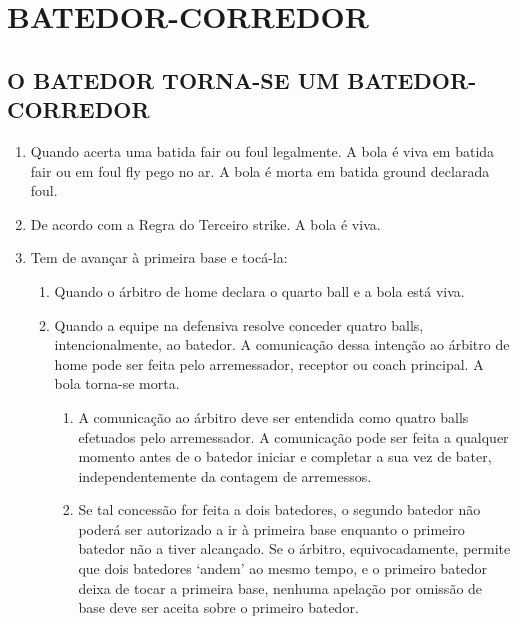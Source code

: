 	\section{BATEDOR-CORREDOR} 
\begin{multicols}{2}
	
	\subsection{O BATEDOR TORNA-SE UM BATEDOR-CORREDOR}
	
	\begin{enumerate}[label=\alph*)]
		\item Quando acerta uma batida \gls{fair} ou \gls{foul} legalmente. A bola \'e viva em batida \gls{fair} 
		ou em \gls{foul fly} pego no ar. A bola \'e morta em batida \gls{ground} declarada \gls{foul}. 
		
		\item  De acordo com a Regra do Terceiro \gls{strike}. A bola \'e viva. 
		
		\item  Tem de avan\c{c}ar \`a primeira base e toc\'a-la: 
		
		\begin{enumerate}[label=\roman*.]
			\item Quando o \'arbitro de \gls{home} declara o quarto \gls{ball} e a bola est\'a viva. 
			
			\item Quando a equipe na defensiva resolve conceder quatro \glspl{ball}, intencionalmente, ao batedor. A comunica\c{c}\~ao dessa inten\c{c}\~ao ao \'arbitro de \gls{home} pode ser feita pelo arremessador, receptor ou \gls{coach} principal. A bola torna-se morta. 
			
			\begin{enumerate}[label=\arabic*)]
				\item  A comunica\c{c}\~ao ao \'arbitro deve ser entendida como quatro \glspl{ball} efetuados pelo arremessador. A comunica\c{c}\~ao pode ser feita a qualquer momento antes de o batedor iniciar e completar a sua vez de bater, independentemente da contagem de arremessos. 
				
				\item Se tal concess\~ao for feita a dois batedores, o segundo batedor n\~ao poder\'a ser autorizado a ir \`a primeira base enquanto o primeiro batedor n\~ao a tiver alcan\c{c}ado. Se o \'arbitro, equivocadamente, permite que dois batedores ‘andem' ao mesmo tempo, e o primeiro batedor deixa de tocar a primeira base, nenhuma apela\c{c}\~ao por omiss\~ao de base deve ser aceita sobre o primeiro batedor. 
				

\end{enumerate}
\end{enumerate}
\end{enumerate}
\end{multicols}

